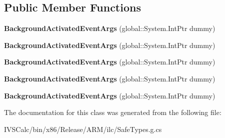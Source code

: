 \subsection*{Public Member Functions}
\begin{DoxyCompactItemize}
\item 
\mbox{\label{class_windows_1_1_application_model_1_1_activation_1_1_background_activated_event_args_a890e74fee8deeefd879283f98db4059c}} 
{\bfseries Background\+Activated\+Event\+Args} (global\+::\+System.\+Int\+Ptr dummy)
\item 
\mbox{\label{class_windows_1_1_application_model_1_1_activation_1_1_background_activated_event_args_a890e74fee8deeefd879283f98db4059c}} 
{\bfseries Background\+Activated\+Event\+Args} (global\+::\+System.\+Int\+Ptr dummy)
\item 
\mbox{\label{class_windows_1_1_application_model_1_1_activation_1_1_background_activated_event_args_a890e74fee8deeefd879283f98db4059c}} 
{\bfseries Background\+Activated\+Event\+Args} (global\+::\+System.\+Int\+Ptr dummy)
\item 
\mbox{\label{class_windows_1_1_application_model_1_1_activation_1_1_background_activated_event_args_a890e74fee8deeefd879283f98db4059c}} 
{\bfseries Background\+Activated\+Event\+Args} (global\+::\+System.\+Int\+Ptr dummy)
\item 
\mbox{\label{class_windows_1_1_application_model_1_1_activation_1_1_background_activated_event_args_a890e74fee8deeefd879283f98db4059c}} 
{\bfseries Background\+Activated\+Event\+Args} (global\+::\+System.\+Int\+Ptr dummy)
\end{DoxyCompactItemize}


The documentation for this class was generated from the following file\+:\begin{DoxyCompactItemize}
\item 
I\+V\+S\+Calc/bin/x86/\+Release/\+A\+R\+M/ilc/Safe\+Types.\+g.\+cs\end{DoxyCompactItemize}
